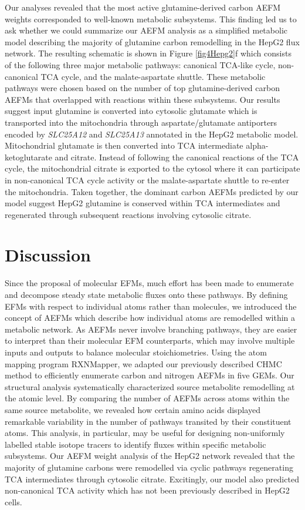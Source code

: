 \documentclass[12pt]{article}
\begin{document}
Our analyses revealed that the most active glutamine-derived carbon AEFM
weights corresponded to well-known metabolic subsystems. This finding led
us to ask whether we could summarize our AEFM analysis as a simplified
metabolic model describing the majority of glutamine carbon remodelling in
the HepG2 flux network. The resulting schematic is shown in Figure
\ref{fig4Hepg2}f which consists of the following three major metabolic
pathways: canonical TCA-like cycle, non-canonical TCA cycle, and the
malate-aspartate shuttle. These metabolic pathways were chosen based on
the number of top glutamine-derived carbon AEFMs that overlapped with
reactions within these subsystems. Our results suggest input glutamine is
converted into cytosolic glutamate which is transported into the
mitochondria through aspartate/glutamate antiporters encoded by
\textit{SLC25A12} and \textit{SLC25A13} annotated in the HepG2 metabolic
model. Mitochondrial glutamate is then converted into TCA intermediate
alpha-ketoglutarate and citrate. Instead of following the canonical
reactions of the TCA cycle, the mitochondrial citrate is exported to the
cytosol where it can participate in non-canonical TCA cycle activity or
the malate-aspartate shuttle to re-enter the mitochondria. Taken together,
the dominant carbon AEFMs predicted by our model suggest HepG2 glutamine
is conserved within TCA intermediates and regenerated through subsequent
reactions involving cytosolic citrate.

\section*{Discussion}

Since the proposal of molecular EFMs, much effort has been made to
enumerate and decompose steady state metabolic fluxes onto these pathways.
By defining EFMs with respect to individual atoms rather than molecules,
we introduced the concept of AEFMs which describe how individual atoms are
remodelled within a metabolic network. As AEFMs never involve branching
pathways, they are easier to interpret than their molecular EFM
counterparts, which may involve multiple inputs and outputs to balance
molecular stoichiometries. Using the atom mapping program RXNMapper, we
adapted our previously described CHMC method to efficiently enumerate
carbon and nitrogen AEFMs in five GEMs. Our structural analysis
systematically characterized source metabolite remodelling at the atomic
level. By comparing the number of AEFMs across atoms within the same
source metabolite, we revealed how certain amino acids displayed
remarkable variability in the number of pathways transited by their
constituent atoms. This analysis, in particular, may be useful for
designing non-uniformly labelled stable isotope tracers to identify fluxes
within specific metabolic subsystems. Our AEFM weight analysis of
the HepG2 network revealed that the majority of glutamine carbons were
remodelled via cyclic pathways regenerating TCA intermediates through
cytosolic citrate. Excitingly, our model also predicted non-canonical TCA
activity which has not been previously described in HepG2 cells.
\end{document}
